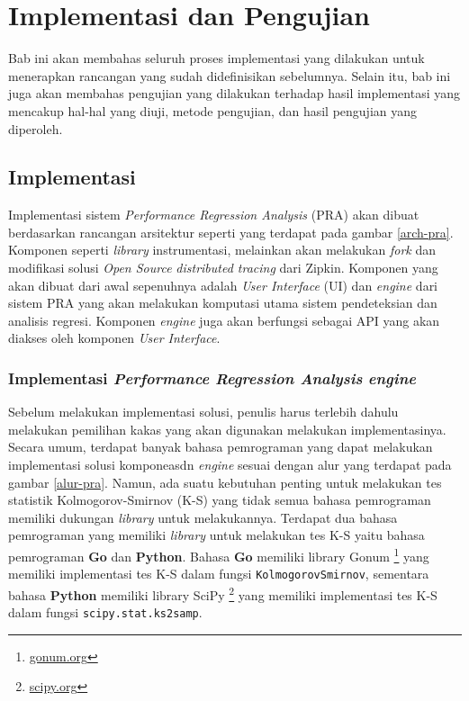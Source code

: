 \chapter{Implementasi dan Pengujian}

Bab ini akan membahas seluruh proses implementasi yang dilakukan untuk menerapkan rancangan yang sudah didefinisikan sebelumnya. Selain itu, bab ini juga akan membahas pengujian yang dilakukan terhadap hasil implementasi yang mencakup hal-hal yang diuji, metode pengujian, dan hasil pengujian yang diperoleh. 


\section{Implementasi}
Implementasi sistem \textit{Performance Regression Analysis} (PRA) akan dibuat berdasarkan rancangan arsitektur seperti yang terdapat pada gambar \ref{arch-pra}. Komponen seperti \textit{library} instrumentasi, melainkan akan melakukan \textit{fork} dan modifikasi solusi \textit{Open Source} \textit{distributed tracing} dari Zipkin. Komponen yang akan dibuat dari awal sepenuhnya adalah \textit{User Interface} (UI) dan \textit{engine} dari sistem PRA yang akan melakukan komputasi utama sistem pendeteksian dan analisis regresi. Komponen \textit{engine} juga akan berfungsi sebagai API yang akan diakses oleh komponen \textit{User Interface}.



\subsection{Implementasi \textit{Performance Regression Analysis} \textit{engine}}

Sebelum melakukan implementasi solusi, penulis harus terlebih dahulu melakukan pemilihan kakas yang akan digunakan melakukan implementasinya. Secara umum, terdapat banyak bahasa pemrograman yang dapat melakukan implementasi solusi komponeasdn \textit{engine} sesuai dengan alur yang terdapat pada gambar \ref{alur-pra}. Namun, ada suatu kebutuhan penting untuk melakukan tes statistik Kolmogorov-Smirnov (K-S) yang tidak semua bahasa pemrograman memiliki dukungan \textit{library} untuk melakukannya. Terdapat dua bahasa pemrograman yang memiliki \textit{library} untuk melakukan tes K-S yaitu bahasa pemrograman \textbf{Go} dan \textbf{Python}. Bahasa \textbf{Go} memiliki library Gonum \footnote{\url{gonum.org}} yang memiliki implementasi tes K-S dalam fungsi \texttt{KolmogorovSmirnov}, sementara bahasa \textbf{Python} memiliki library SciPy \footnote{\url{scipy.org}} yang memiliki implementasi tes K-S dalam fungsi \texttt{scipy.stat.ks\textunderscore 2samp}.

